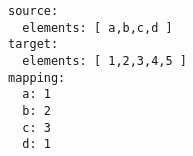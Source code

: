 \par\begin{minipage}{60ex}
\begin{verbatim}
source:
  elements: [ a,b,c,d ]
target:
  elements: [ 1,2,3,4,5 ]
mapping:
  a: 1
  b: 2
  c: 3
  d: 1

\end{verbatim}
\end{minipage}\par